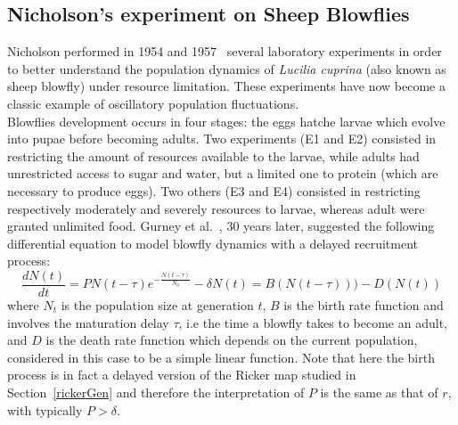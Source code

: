 \documentclass[12pt]{article}
\begin{document}
	\subsection{Nicholson's experiment on Sheep Blowflies} \label{Nicholson}
	Nicholson performed in 1954 and 1957~\cite{nicholson1954outline, nicholson1957self} several
	laboratory experiments in order to better understand the population dynamics of \emph{Lucilia cuprina} (also known as sheep blowfly)
	under resource limitation. These experiments have now become a classic example of oscillatory population fluctuations. \\
	Blowflies development occurs in four stages: the eggs hatche larvae which evolve into pupae before becoming adults. Two experiments  (E1 and E2) consisted in restricting the amount of resources available to the larvae, while adults had unrestricted access to sugar and water, but a limited one to protein (which are necessary to produce eggs). Two others (E3 and E4) consisted in restricting respectively moderately and severely resources to larvae, whereas adult were granted unlimited food. Gurney et al.~\cite{gurney1980nicholson}, 30 years later, suggested the following differential equation to model blowfly dynamics with a delayed recruitment process:
	\begin{equation} \label{blowEq}
		\frac{d N(t)}{d t} = PN(t-\tau)e^{-\frac{N(t-\tau)}{N_0}} -  \delta N(t) = B(N(t-\tau))) - D(N(t))
	\end{equation} 
	where $N_t$ is the population size at generation $t$, $B$ is the birth rate function and involves the maturation delay $\tau$, i.e the time a blowfly takes to become an adult, and $D$ is the death rate function which depends on the current population, considered in this case to be a simple linear function. Note that here the birth process is in fact a delayed version of the Ricker map studied in Section~\ref{rickerGen} and therefore the interpretation of $P$ is the same as that of $r$, with typically $P > \delta$.
	
\end{document}
